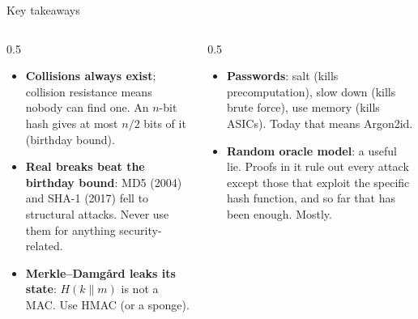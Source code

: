 \ifdefined\PRESENTATION\else\PassOptionsToClass{handout}{beamer}\fi\documentclass[aspectratio=169, lualatex]{beamer}
\begin{document}
\begin{frame}{Key takeaways}
	\begin{columns}[c]
		\begin{column}{0.5\textwidth}
			\begin{itemize}
				\item \textbf{Collisions always exist}; collision resistance means nobody can find one. An $n$-bit hash gives at most $n/2$ bits of it (birthday bound).
				\item \textbf{Real breaks beat the birthday bound}: MD5 (2004) and SHA-1 (2017) fell to structural attacks. Never use them for anything security-related.
				\item \textbf{Merkle--Damg\aa rd leaks its state}: $H(k \| m)$ is not a MAC. Use HMAC (or a sponge).
			\end{itemize}
		\end{column}
		\begin{column}{0.5\textwidth}
			\begin{itemize}
				\item \textbf{Passwords}: salt (kills precomputation), slow down (kills brute force), use memory (kills ASICs). Today that means Argon2id.
				\item \textbf{Random oracle model}: a useful lie. Proofs in it rule out every attack except those that exploit the specific hash function, and so far that has been enough. Mostly.
			\end{itemize}
		\end{column}
	\end{columns}
\end{frame}

\begin{frame}[plain]
	\titlepage
\end{frame}
\end{document}
